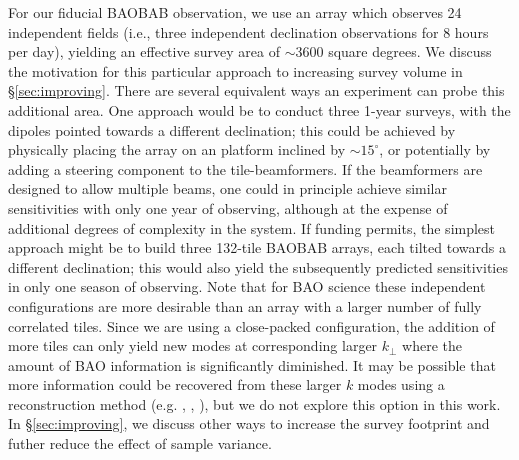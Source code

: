 \documentclass[10pt,iop]{emulateapj}
\begin{document}
For our fiducial BAOBAB observation, we use an array which observes 24 independent fields
(i.e., three independent declination observations for 8 hours per day), yielding an
effective survey area of $\sim 3600$ square degrees.  
We discuss the motivation for this particular approach to increasing survey volume in
\S\ref{sec:improving}.
There are several equivalent ways an 
experiment can probe this additional area.  One approach would be to conduct three 1-year surveys,
with the dipoles pointed towards a different declination; this could be achieved by physically
placing the array on an platform inclined by $\sim 15^{\circ}$, or potentially by adding a steering
component to the tile-beamformers.  If the beamformers are designed to allow multiple beams, one
could in principle achieve similar sensitivities with only one year of observing, although
at the expense of additional degrees of complexity in the system.  If funding permits, the 
simplest approach might be to build three 132-tile BAOBAB arrays, each tilted towards a different
declination; this would also yield the subsequently predicted sensitivities in only one season of
observing.  Note that for BAO science these independent configurations are more desirable than
an array with a larger number of fully correlated tiles.  Since we are using a close-packed
configuration, the addition of more tiles can only yield new modes at corresponding larger $k_{\perp}$ 
where the amount of BAO information is significantly diminished.  It may be possible
that more information could be recovered from these larger $k$ modes using a reconstruction
method (e.g. \citealt{eisenstein_et_al_2007}, \citealt{padmanabhan_et_al_2009},
\citealt{noh_et_al_2009}), but we do not explore this option in this work.  In \S\ref{sec:improving},
we discuss other ways to increase the survey footprint and futher reduce the effect of sample
variance.
\end{document}
